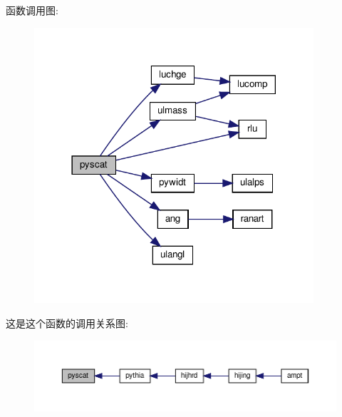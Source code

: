 函数调用图\+:
\nopagebreak
\begin{figure}[H]
\begin{center}
\leavevmode
\includegraphics[width=294pt]{pyscat_8f90_a421f30ce6ae114439ec80e4acd031139_cgraph}
\end{center}
\end{figure}
这是这个函数的调用关系图\+:
\nopagebreak
\begin{figure}[H]
\begin{center}
\leavevmode
\includegraphics[width=350pt]{pyscat_8f90_a421f30ce6ae114439ec80e4acd031139_icgraph}
\end{center}
\end{figure}
